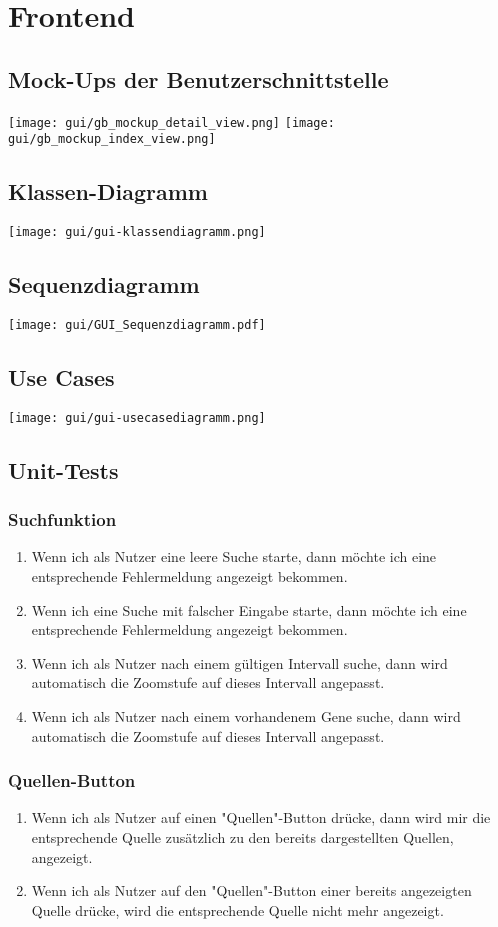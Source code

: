 \section{Frontend}
\subsection{Mock-Ups der Benutzerschnittstelle}
\texttt{[image: gui/gb\_mockup\_detail\_view.png]}
\texttt{[image: gui/gb\_mockup\_index\_view.png]}
\subsection{Klassen-Diagramm}
\texttt{[image: gui/gui-klassendiagramm.png]}
\subsection{Sequenzdiagramm}
\texttt{[image: gui/GUI\_Sequenzdiagramm.pdf]}
\subsection{Use Cases}
\texttt{[image: gui/gui-usecasediagramm.png]}
\subsection{Unit-Tests}
\subsubsection{Suchfunktion}
\begin{enumerate}
	\item Wenn ich als Nutzer eine leere Suche starte, dann möchte ich eine entsprechende Fehlermeldung angezeigt bekommen.
	\item Wenn ich eine Suche mit falscher Eingabe starte, dann möchte ich eine entsprechende Fehlermeldung angezeigt bekommen.
	\item Wenn ich als Nutzer nach einem gültigen Intervall suche, dann wird automatisch die Zoomstufe auf dieses Intervall angepasst.
	\item Wenn ich als Nutzer nach einem vorhandenem Gene suche, dann wird automatisch die Zoomstufe auf dieses Intervall angepasst.
\end{enumerate}


\subsubsection{Quellen-Button}
\begin{enumerate}
	\item Wenn ich als Nutzer auf einen "Quellen"-Button drücke, dann wird mir die entsprechende Quelle zusätzlich zu den bereits dargestellten Quellen, angezeigt.
	\item Wenn ich als Nutzer auf den "Quellen"-Button einer bereits angezeigten Quelle drücke, wird die entsprechende Quelle nicht mehr angezeigt.
\end{enumerate}

